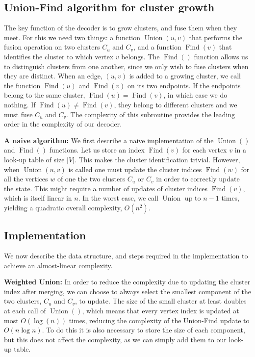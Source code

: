 \documentclass[a4paper, 10pt, accepted=2021-11-03]{quantumarticle}
\DeclareMathOperator{\Find}{Find}
\DeclareMathOperator{\Union}{Union}
\begin{document}
\subsection{Union-Find algorithm for cluster growth}
The key function of the decoder is to grow clusters, and fuse them when they
meet. For this we need two things: a function $\Union(u, v)$ that performs the 
fusion operation on two clusters
$C_u$ and $C_v$, and a function $\Find(v)$ that identifies the cluster to which
vertex $v$ belongs. The $\Find()$ function
allows us to distinguish clusters from one another, since we only wish to fuse
clusters when they are distinct.  
When an edge, $(u,v)$ is added to a growing cluster, we call the function
$\Find(u)$ and $\Find(v)$ on its two endpoints. 
If the endpoints belong to the same cluster, $\Find(u)=\Find(v)$,
in which case we do nothing. If $\Find(u)\neq\Find(v)$, they belong to different clusters and we must fuse
$C_u$ and $C_v$. The complexity of this subroutine provides the leading order in the complexity of 
our decoder.

\medskip
{\bf A naive algorithm:}
We first describe a naive implementation of the $\Union()$ and $\Find()$ functions.
Let us store an index $\Find(v)$ for each vertex $v$
in a look-up table of size $|V|$.
This makes the cluster identification trivial.
However, when $\Union(u, v)$ is called one must update 
the cluster indices $\Find(w)$ for all the vertices $w$ of one the 
two clusters $C_u$ or $C_v$ in order to correctly update the state. 
This might require a number of updates of cluster indices $\Find(v)$,
which is itself linear in $n$. 
In the worst case, we call $\Union$ up to $n-1$ times, yielding a 
quadratic overall complexity, $O(n^2)$.

\subsection{Implementation}
We now describe the data structure, and steps required in the implementation
to achieve an almost-linear complexity. 

\medskip
{\bf Weighted Union:}
In order to reduce the complexity due to updating the cluster index
after merging, we can choose to always select the smallest component of the two 
clusters, $C_u$ and $C_v$, to update.
The size of the small cluster at least doubles at each call of $\Union()$,
which means that every vertex index is updated at most $O(\log(n))$ times,
reducing the complexity of the Union-Find update to $O(n \log n)$.
To do this it is also necessary to store the size of each component, but this
does not affect the complexity, as we can simply add them to our look-up table. 
\end{document}

